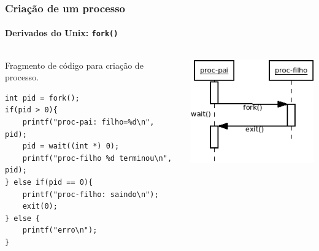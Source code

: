 %
\begin{frame}[fragile]
  \frametitle{Criação de um processo}
  \framesubtitle{Derivados do Unix: \lstinline{fork()}}
  \begin{columns}
    \begin{column}{.6\textwidth}\scriptsize
\noindent Fragmento de código para %
criação de processo.\\\bigskip      
\begin{lstlisting}
int pid = fork();
if(pid > 0){
    printf("proc-pai: filho=%d\n", pid);
    pid = wait((int *) 0);
    printf("proc-filho %d terminou\n", pid);
} else if(pid == 0){
    printf("proc-filho: saindo\n");
    exit(0);
} else {
    printf("erro\n");
}
\end{lstlisting}
\end{column}
    \begin{column}{.4\textwidth}
      \includegraphics[scale=.525]{fork.png}
    \end{column}
  \end{columns}

\end{frame}

